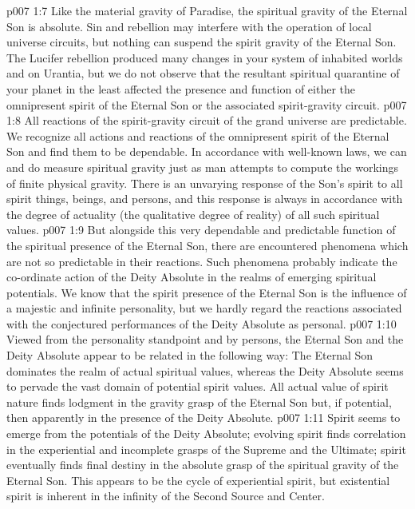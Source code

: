 \pc \vs p007 1:7 Like the material gravity of Paradise, the spiritual gravity of the Eternal Son is absolute. Sin and rebellion may interfere with the operation of local universe circuits, but nothing can suspend the spirit gravity of the Eternal Son. The Lucifer rebellion produced many changes in your system of inhabited worlds and on Urantia, but we do not observe that the resultant spiritual quarantine of your planet in the least affected the presence and function of either the omnipresent spirit of the Eternal Son or the associated spirit\hyp{}gravity circuit.
\pc \vs p007 1:8 All reactions of the spirit\hyp{}gravity circuit of the grand universe are predictable. We recognize all actions and reactions of the omnipresent spirit of the Eternal Son and find them to be dependable. In accordance with well\hyp{}known laws, we can and do measure spiritual gravity just as man attempts to compute the workings of finite physical gravity. There is an unvarying response of the Son’s spirit to all spirit things, beings, and persons, and this response is always in accordance with the degree of actuality (the qualitative degree of reality) of all such spiritual values.
\vs p007 1:9 But alongside this very dependable and predictable function of the spiritual presence of the Eternal Son, there are encountered phenomena which are not so predictable in their reactions. Such phenomena probably indicate the co\hyp{}ordinate action of the Deity Absolute in the realms of emerging spiritual potentials. We know that the spirit presence of the Eternal Son is the influence of a majestic and infinite personality, but we hardly regard the reactions associated with the conjectured performances of the Deity Absolute as personal.
\pc \vs p007 1:10 Viewed from the personality standpoint and by persons, the Eternal Son and the Deity Absolute appear to be related in the following way: The Eternal Son dominates the realm of actual spiritual values, whereas the Deity Absolute seems to pervade the vast domain of potential spirit values. All actual value of spirit nature finds lodgment in the gravity grasp of the Eternal Son but, if potential, then apparently in the presence of the Deity Absolute.
\vs p007 1:11 Spirit seems to emerge from the potentials of the Deity Absolute; evolving spirit finds correlation in the experiential and incomplete grasps of the Supreme and the Ultimate; spirit eventually finds final destiny in the absolute grasp of the spiritual gravity of the Eternal Son. This appears to be the cycle of experiential spirit, but existential spirit is inherent in the infinity of the Second Source and Center.
